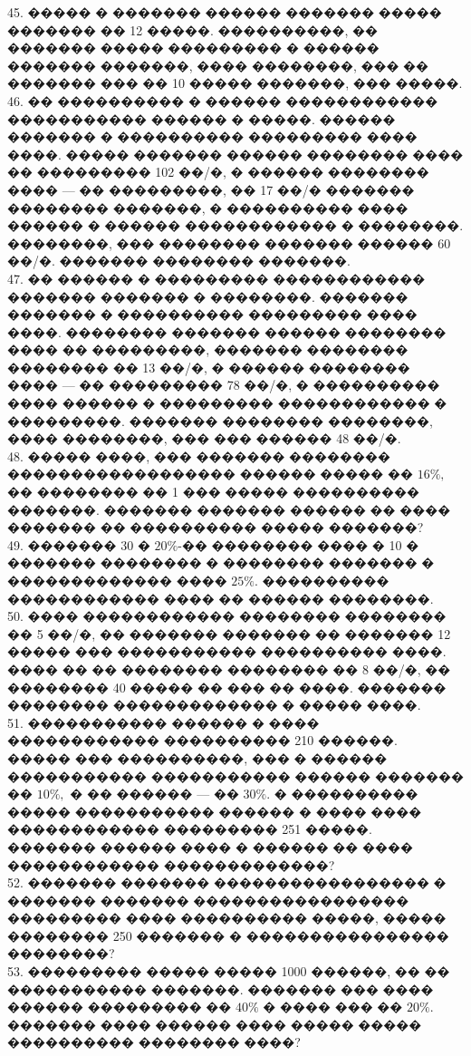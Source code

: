\documentclass[12pt]{article}
\begin{document}
45. ����� � ������� ������ ������� ����� ������� �� 12 �����. ����������, �� ������� ����� ��������� � ������ ������� �������, ���� ��������, ��� �� ������� ��� �� 10 ����� �������, ��� �����.\\
46. �� ���������� � ������ ������������ ����������� ������ � �����. ������ ������� � ���������� ��������� ���� ����. ����� ������� ������ �������� ���� �� ��������� 102 ��/�, � ������ �������� ���� --- �� ���������, �� 17 ��/� ������� �������� �������, � ���������� ���� ������ � ������ ������������ � ��������. ��������, ��� �������� ������� ������ 60 ��/�. ������� �������� �������.\\
47. �� ������ � ��������� ������������ ������� ������� � ��������. ������� ������� � ���������� ��������� ���� ����. �������� ������� ������ �������� ���� �� ���������, ������� �������� �������� �� 13 ��/�, � ������ �������� ���� --- �� ��������� 78 ��/�, � ���������� ���� ������ � ��������� ������������ � ���������. ������� �������� ��������, ���� ��������, ��� ��� ������ 48 ��/�.\\
48. ����� ����, ��� ������� �������� ������������������ ������ ����� �� $16\%,$ �� �������� �� 1 ��� ����� ���������� �������. ������� ������� ������ �� ���� ������� �� ���������� ����� �������?\\
49. ������� 30 � $20\%$-�� �������� ���� � 10 � ������� �������� � �������� ������� � ������������� ���� $25\%.$ ���������� ������������ ���� �� ������ ��������.\\
50. ���� ������������ �������� �������� �� 5 ��/�, �� ������� ������� �� ������� 12 ����� ��� ����������� ���������� ����. ���� �� �� �������� �������� �� 8 ��/�, �� �������� 40 ����� �� ��� �� ����. ������� �������� ������������� � ����� ����.\\
51. ����������� ������ � ���� ������������ ���������� 210 ������. ����� ��� ����������, ��� � ������ ����������� ����������� ������ ������� �� $10\%,$ � �� ������ --- �� $30\%.$ � ���������� ����� ����������� ������ � ���� ���� ������������ ��������� 251 �����. ������� ������ ���� � ������ �� ���� ������������ �������������?\\
52. ������� ������� ����������������� � ������� ������� ����������������� ��������� ���� ���������� �����, ����� �������� 250 ������� � ���������������� ��������?\\
53. ��������� ����� ����� 1000 ������, �� �� ����������� �������. ������� ��� ���� ������ ��������� �� $40\%$ � ���� ��� �� $20\%.$ ������� ���� ������ ���� ����� ����� ���������� �������� ����?\\
\end{document}
